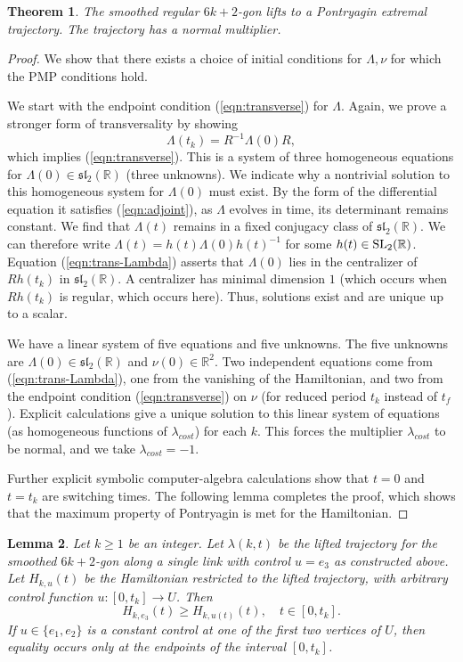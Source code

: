 \documentclass{article}
\newtheorem{theorem}{Theorem}[subsection]
\newtheorem{lemma}[theorem]{Lemma}
\theoremstyle{remark}
\newcommand{\ring}[1]{\mathbb{#1}}
\newcommand{\op}[1]{\hbox{#1}}
\def\sl{\mathfrak{sl}_2(\ring{R})}
\def\SL{\op{SL}_2(\ring{R})}
\begin{document}
\begin{theorem}\label{thm:pmp} 
The smoothed regular $6k+2$-gon lifts to a Pontryagin
  extremal trajectory.  The trajectory has a normal multiplier.
\end{theorem}

\begin{proof}
We show that there exists a choice of initial conditions for
$\Lambda,\nu$ for which the PMP conditions hold.

We start with the endpoint condition (\ref{eqn:transverse}) for $\Lambda$.
Again, we prove a stronger form of transversality by showing
\begin{equation}\label{eqn:trans-Lambda}
\Lambda(t_k) = R^{-1} \Lambda(0) R,
\end{equation}
which implies (\ref{eqn:transverse}).  This is a system of three
homogeneous equations for $\Lambda(0)\in \sl$ (three unknowns).  We
indicate why a nontrivial solution to this homogeneous system for
$\Lambda(0)$ must exist.  By the form of the differential equation it
satisfies (\ref{eqn:adjoint}), as $\Lambda$ evolves in time, its
determinant remains constant.  We find that $\Lambda(t)$ remains in a
fixed conjugacy class of $\sl$.  We can therefore write $\Lambda(t) =
h(t) \Lambda(0) h(t)^{-1}$ for some $h(t)\in\SL$.  Equation
(\ref{eqn:trans-Lambda}) asserts that $\Lambda(0)$ lies in the
centralizer of $R h(t_k)$ in $\sl$.  A centralizer has minimal
dimension $1$ (which occurs when $R h(t_k)$ is regular, which occurs
here).  Thus, solutions exist and are unique up to a scalar.

We have a linear system of five equations and five unknowns.  The five
unknowns are $\Lambda(0)\in\sl$ and $\nu(0)\in\ring{R}^2$.  Two
independent equations come from (\ref{eqn:trans-Lambda}), one from the
vanishing of the Hamiltonian, and two from the endpoint condition
(\ref{eqn:transverse}) on $\nu$ (for reduced period $t_k$ instead of
$t_f$).  Explicit calculations give a unique solution to this linear
system of equations (as homogeneous functions of $\lambda_{cost}$) for
each $k$.  This forces the multiplier $\lambda_{cost}$ to be normal,
and we take $\lambda_{cost}=-1$.

Further explicit symbolic computer-algebra calculations show that
$t=0$ and $t=t_k$ are switching times.
The following lemma completes the proof, which shows that the
maximum property of Pontryagin is met for the Hamiltonian.
\end{proof}

\begin{lemma}  
  Let $k\ge 1$ be an integer.  Let $\lambda(k,t)$ be the lifted
  trajectory for the smoothed $6k+2$-gon along a single link with control
  $u=e_3$ as constructed above.  Let $H_{k,u}(t)$ be the
  Hamiltonian restricted to the lifted trajectory, with arbitrary control
  function $u:[0,t_k]\to U$.  Then
\[
H_{k,e_3}(t) \ge H_{k,u(t)}(t),\quad t\in [0,t_k].
\]
If $u\in \{e_1,e_2\}$ is a constant control at one of the first two vertices
of $U$, then equality occurs only at the endpoints of the interval $[0,t_k]$.
\end{lemma}
\end{document}

